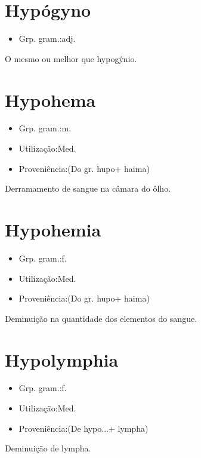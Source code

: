 \documentclass{article}
\begin{document}
\section{Hypógyno}
\begin{itemize}
\item {Grp. gram.:adj.}
\end{itemize}
O mesmo ou melhor que \textunderscore hypogýnio\textunderscore .
\section{Hypohema}
\begin{itemize}
\item {Grp. gram.:m.}
\end{itemize}
\begin{itemize}
\item {Utilização:Med.}
\end{itemize}
\begin{itemize}
\item {Proveniência:(Do gr. \textunderscore hupo\textunderscore  + \textunderscore haima\textunderscore )}
\end{itemize}
Derramamento de sangue na câmara do ôlho.
\section{Hypohemia}
\begin{itemize}
\item {Grp. gram.:f.}
\end{itemize}
\begin{itemize}
\item {Utilização:Med.}
\end{itemize}
\begin{itemize}
\item {Proveniência:(Do gr. \textunderscore hupo\textunderscore  + \textunderscore haima\textunderscore )}
\end{itemize}
Deminuição na quantidade dos elementos do sangue.
\section{Hypolymphia}
\begin{itemize}
\item {Grp. gram.:f.}
\end{itemize}
\begin{itemize}
\item {Utilização:Med.}
\end{itemize}
\begin{itemize}
\item {Proveniência:(De \textunderscore hypo...\textunderscore  + \textunderscore lympha\textunderscore )}
\end{itemize}
Deminuição de lympha.
\end{document}
